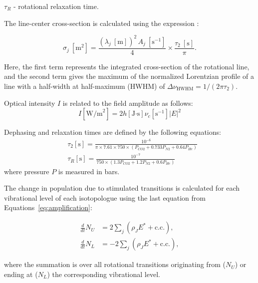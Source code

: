 $\tau_R$ - rotational relaxation time.



The line-center cross-section is calculated using the expression \cite{Hilborn-2002}:

\begin{equation}\label{eq:sigma}
\sigma_j\ [\text{m}^2] = \frac{ (\lambda_j\ [\text{m}])^2\, A_j\ [\text{s}^{-1}] }{4} \times \frac{ \tau_2\ [\text{s}] }{ \pi }.
\end{equation}

Here, the first term represents the integrated cross-section of the rotational line, and the second term gives the maximum of the normalized Lorentzian profile of a line with a half-width at half-maximum (HWHM) of $\Delta \nu_{\text{HWHM}} = 1/(2\pi \tau_2)$.

Optical intensity $I$ is related to the field amplitude as follows:
\begin{equation}\label{eq:I}
I[\text{W/m}^2] = 2 h[\text{J·s}] \nu _c[\text{s}^{-1}] |E|^2
\end{equation}

Dephasing and relaxation times are defined by the following equations:
\begin{equation}\label{eq:relaxation}
\begin{aligned}
&\tau_2[\text{s}] = \frac{10^{- 6}}{\pi \times 7.61 \times 750 \times (P_{CO2}+0.733P_{N2}+0.64P_{He})}\\
&\tau _R[\text{s}] = \frac{10^{-7}}{750 \times (1.3P_{CO2}+1.2P_{N2}+0.6P_{He})}
\end{aligned}
\end{equation}
where pressure $P$ is measured in bars.


The change in population due to stimulated transitions is calculated for each vibrational level of each isotopologue using the last equation from Equations~\eqref{eq:amplification}:

\begin{equation}\label{eq:dNdt}
\begin{aligned}
\frac{d}{dt} N_U &= 2 \sum_{j} \left( \rho_J E^* + \text{c.c.} \right), \\
\frac{d}{dt} N_L &= -2 \sum_{j} \left( \rho_J E^* + \text{c.c.} \right),
\end{aligned}
\end{equation}

where the summation is over all rotational transitions originating from ($N_U$) or ending at ($N_L$) the corresponding vibrational level.

